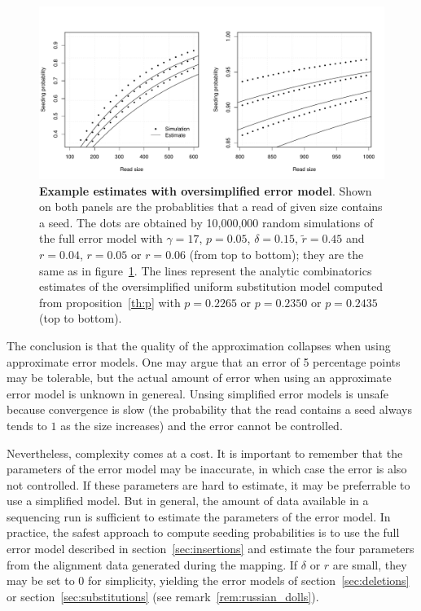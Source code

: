 \documentclass{article}
\begin{document}
\begin{figure}[h]
\centering
\includegraphics[scale=0.445]{simulp_approx.pdf}
\caption{\textbf{Example estimates with oversimplified error model}.
Shown on both panels are the probablities that a read of given size
contains a seed. The dots are obtained by 10,000,000 random simulations of
the full error model with $\gamma=17$, $p=0.05$, $\delta=0.15$, $\tilde{r}
= 0.45$ and $r=0.04$, $r=0.05$ or $r=0.06$ (from top to bottom); they
are the same as in figure~\ref{fig:simulp_approx}. The lines represent the
analytic combinatorics estimates of the oversimplified uniform
substitution model computed from proposition~\ref{th:p} with $p=0.2265$ or
$p=0.2350$ or $p=0.2435$ (top to bottom).}
\label{fig:simulp_approx}
\end{figure}

The conclusion is that the quality of the approximation collapses when
using approximate error models. One may argue that an error of 5
percentage points may be tolerable, but the actual amount of error when
using an approximate error model is unknown in genereal. Unsing simplified
error models is unsafe because convergence is slow (the probability that
the read contains a seed always tends to $1$ as the size increases) and
the error cannot be controlled.

Nevertheless, complexity comes at a cost. It is important to remember that
the parameters of the error model may be inaccurate, in which case the
error is also not controlled. If these parameters are hard to estimate, it
may be preferrable to use a simplified model. But in general, the amount
of data available in a sequencing run is sufficient to estimate the
parameters of the error model. In practice, the safest approach to compute
seeding probabilities is to use the full error model described in
section~\ref{sec:insertions} and estimate the four parameters from the
alignment data generated during the mapping. If $\delta$ or $r$
are small, they may be set to $0$ for simplicity, yielding the error
models of section~\ref{sec:deletions} or section~\ref{sec:substitutions}
(see remark~\ref{rem:russian_dolls}).
\end{document}

